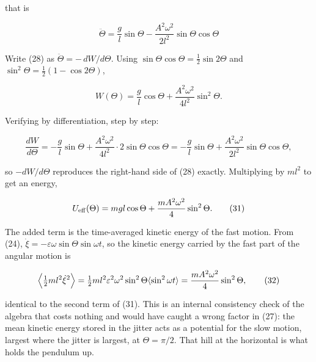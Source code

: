 \documentclass[11pt,a4paper]{article}
\newcommand{\tagmark}[1]{\marginnote{\scriptsize\ttfamily #1}}
\newcommand{\Dtag}{\tagmark{[D]}}   %
\begin{document}
that is

\begin{equation}
\boxed{\;\ddot\Theta = \frac{g}{l}\sin\Theta
   - \frac{A^2\omega^2}{2l^2}\sin\Theta\cos\Theta\;} \tag{28}
\end{equation}

Write (28) as \(\ddot\Theta = -\,dW/d\Theta\). Using
\(\sin\Theta\cos\Theta=\tfrac12\sin2\Theta\) and
\(\sin^2\Theta=\tfrac12(1-\cos2\Theta)\),

\begin{equation}
W(\Theta) = \frac{g}{l}\cos\Theta
   + \frac{A^2\omega^2}{4l^2}\sin^2\Theta. \tag{29}
\end{equation}

Verifying by differentiation, step by step:

\begin{equation}
\frac{dW}{d\Theta}
 = -\frac{g}{l}\sin\Theta
   + \frac{A^2\omega^2}{4l^2}\cdot 2\sin\Theta\cos\Theta
 = -\frac{g}{l}\sin\Theta
   + \frac{A^2\omega^2}{2l^2}\sin\Theta\cos\Theta, \tag{30}
\end{equation}

so \(-dW/d\Theta\) reproduces the right-hand side of (28) exactly. Multiplying by
\(ml^2\) to get an energy,

\begin{equation}
U_{\rm eff}(\Theta) = mgl\cos\Theta
  + \frac{mA^2\omega^2}{4}\sin^2\Theta. \tag{31}
\end{equation}

\Dtag{} The added term is the time-averaged kinetic energy of the fast motion.
From (24), \(\dot\xi=-\varepsilon\omega\sin\Theta\sin\omega t\), so the kinetic
energy carried by the fast part of the angular motion is

\begin{equation}
\Bigl\langle \tfrac12 m l^2\dot\xi^2\Bigr\rangle
 = \tfrac12 m l^2\varepsilon^2\omega^2\sin^2\Theta
   \langle\sin^2\omega t\rangle
 = \frac{m A^2\omega^2}{4}\sin^2\Theta, \tag{32}
\end{equation}

identical to the second term of (31). This is an internal consistency check of
the algebra that costs nothing and would have caught a wrong factor in (27): the
mean kinetic energy stored in the jitter acts as a potential for the slow
motion, largest where the jitter is largest, at \(\Theta=\pi/2\). That hill at the
horizontal is what holds the pendulum up.
\end{document}
